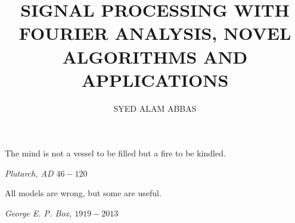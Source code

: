 \documentclass{UCF_ETD}
\title{SIGNAL PROCESSING WITH FOURIER ANALYSIS, NOVEL ALGORITHMS AND APPLICATIONS} %
\author{SYED ALAM ABBAS} %
\begin{document}
\frontmatter

\maketitle


\pagebreak

\epigraph{ The mind is not a vessel to be filled but a fire to be kindled.}{\itshape Plutarch, AD $46 -120$}
\epigraph{All models are wrong, but some are useful.}{\itshape George E. P. Box, $1919-2013$ }

\pagebreak
\end{document}
